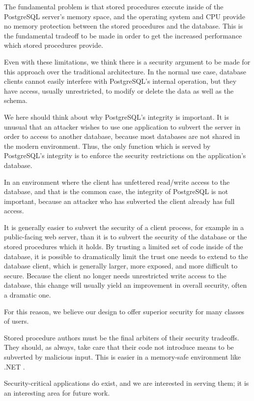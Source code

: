 \documentclass[sigconf,techreport,authorversion,nonacm]{acmart}
\newcommand{\dotnet}{.NET }
\begin{document}
The fundamental problem is that stored procedures execute inside
of the PostgreSQL server's memory space, and the operating system
and CPU provide no memory protection between the stored procedures
and the database. This is the fundamental tradeoff to be made in
order to get the increased performance which stored procedures
provide.

Even with these limitations, we think there is a security argument
to be made for this approach over the traditional architecture. In
the normal use case, database clients cannot easily interfere with
PostgreSQL's internal operation, but they have access, usually
unrestricted, to modify or delete the data as well as the schema.

We here should think about why PostgreSQL's integrity is important.
It is unusual that an attacker wishes to use one application to subvert
the server in order to access to another database, because
most databases are not shared in the modern environment. Thus, the
only function which is served by PostgreSQL's integrity is to
enforce the security restrictions on the application's database.

In an environment where the client has unfettered read/write access
to the database, and that is the common case, the integrity of
PostgreSQL is not important, because an attacker who has subverted
the client already has full access.

It is generally easier to subvert the security of a client process,
for example in a public-facing web server, than it is to subvert
the security of the database or the stored procedures which it
holds. By trusting a limited set of code inside of the database,
it is possible to dramatically limit the trust one needs to extend
to the database client, which is generally larger, more exposed,
and more difficult to secure. Because the client no longer needs
unrestricted write access to the database, this change will usually
yield an improvement in overall security, often a dramatic one.

For this reason, we believe our design to offer superior security
for many classes of users.

Stored procedure authors must be the final arbiters of their security
tradeoffs. They should, as always, take care that their code not
introduce means to be subverted by malicious input. This is easier
in a memory-safe environment like \dotnet.

Security-critical applications do exist, and we are interested in
serving them; it is an interesting area for future work.
\end{document}
